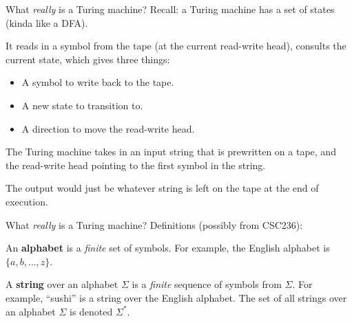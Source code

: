 \documentclass{beamer}
\begin{document}
\begin{frame}{What \textit{really} is a Turing machine?}
Recall: a Turing machine has a set of states (kinda like a DFA).

It reads in a symbol from the tape (at the current read-write head), consults the current state, which gives three things:
\begin{itemize}
\item A symbol to write back to the tape.
\item A new state to transition to.
\item A direction to move the read-write head.
\end{itemize}

The Turing machine takes in an input string that is prewritten on a tape, and the read-write head pointing to the first symbol in the string.
\begin{center}
\end{center}
The output would just be whatever string is left on the tape at the end of execution.

\end{frame}

\begin{frame}{What \textit{really} is a Turing machine?}
Definitions (possibly from CSC236):

\vspace{4mm}

An \textbf{alphabet} is a \textit{finite} set of symbols. For example, the English alphabet is $\{a, b, \ldots, z\}$.

\vspace{2mm}

A \textbf{string} over an alphabet $\Sigma$ is a \textit{finite} sequence of symbols from $\Sigma$. For example, ``sushi'' is a string over the English alphabet. The set of all strings over an alphabet $\Sigma$ is denoted $\Sigma^*$.
\end{frame}
\end{document}
